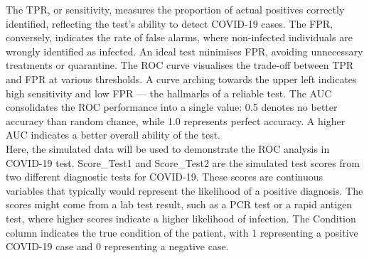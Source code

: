 \documentclass{article}\usepackage[]{graphicx}\usepackage[]{xcolor}
\numberwithin{equation}{section}
\begin{document}
\noindent
The TPR, or sensitivity, measures the proportion of actual positives correctly identified, reflecting the test's ability to detect COVID-19 cases. The FPR, conversely, indicates the rate of false alarms, where non-infected individuals are wrongly identified as infected. An ideal test minimises FPR, avoiding unnecessary treatments or quarantine. The ROC curve visualises the trade-off between TPR and FPR at various thresholds. A curve arching towards the upper left indicates high sensitivity and low FPR — the hallmarks of a reliable test. The AUC consolidates the ROC performance into a single value: 0.5 denotes no better accuracy than random chance, while 1.0 represents perfect accuracy. A higher AUC indicates a better overall ability of the test.\\

\noindent
Here, the simulated data will be used to demonstrate the ROC analysis in COVID-19 test. Score\_Test1 and Score\_Test2 are the simulated test scores from two different diagnostic tests for COVID-19. These scores are continuous variables that typically would represent the likelihood of a positive diagnosis. The scores might come from a lab test result, such as a PCR test or a rapid antigen test, where higher scores indicate a higher likelihood of infection. The Condition column indicates the true condition of the patient, with 1 representing a positive COVID-19 case and 0 representing a negative case.
\end{document}
